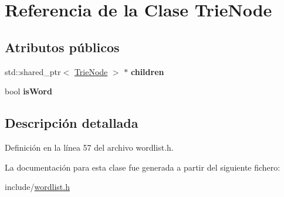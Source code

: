 \hypertarget{classTrieNode}{}\section{Referencia de la Clase Trie\+Node}
\label{classTrieNode}
\subsection*{Atributos públicos}
\begin{DoxyCompactItemize}
\item 
\mbox{\label{classTrieNode_abfaf4116932baeb5904d5f5ea563d67f}} 
std\+::shared\+\_\+ptr$<$ \hyperlink{classTrieNode}{Trie\+Node} $>$ $\ast$ {\bfseries children}
\item 
\mbox{\label{classTrieNode_a675995a5b96c952c10c3c13e22f4baf0}} 
bool {\bfseries is\+Word}
\end{DoxyCompactItemize}


\subsection{Descripción detallada}


Definición en la línea 57 del archivo wordlist.\+h.



La documentación para esta clase fue generada a partir del siguiente fichero\+:\begin{DoxyCompactItemize}
\item 
include/\hyperlink{wordlist_8h}{wordlist.\+h}\end{DoxyCompactItemize}
